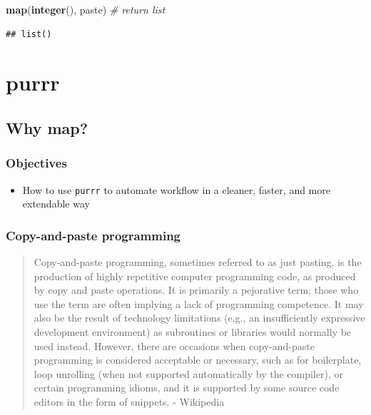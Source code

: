 \documentclass[
]{book}
\newenvironment{Shaded}{\begin{snugshade}}{\end{snugshade}}
\newcommand{\CommentTok}[1]{\textcolor[rgb]{0.56,0.35,0.01}{\textit{#1}}}
\newcommand{\FunctionTok}[1]{\textcolor[rgb]{0.13,0.29,0.53}{\textbf{#1}}}
\newcommand{\NormalTok}[1]{#1}
\providecommand{\tightlist}{%
  \setlength{\itemsep}{0pt}\setlength{\parskip}{0pt}}
\begin{document}
\begin{Shaded}
\begin{Highlighting}[]
\FunctionTok{map}\NormalTok{(}\FunctionTok{integer}\NormalTok{(), paste) }\CommentTok{\# return list}
\end{Highlighting}
\end{Shaded}

\begin{verbatim}
## list()
\end{verbatim}

\section{purrr}\label{purrr}

\subsection{Why map?}\label{why-map}

\subsubsection{Objectives}\label{objectives-1}

\begin{itemize}
\tightlist
\item
  How to use \texttt{purrr} to automate workflow in a cleaner, faster, and more extendable way
\end{itemize}

\subsubsection{Copy-and-paste programming}\label{copy-and-paste-programming}

\begin{quote}
Copy-and-paste programming, sometimes referred to as just pasting, is the production of highly repetitive computer programming code, as produced by copy and paste operations. It is primarily a pejorative term; those who use the term are often implying a lack of programming competence. It may also be the result of technology limitations (e.g., an insufficiently expressive development environment) as subroutines or libraries would normally be used instead. However, there are occasions when copy-and-paste programming is considered acceptable or necessary, such as for boilerplate, loop unrolling (when not supported automatically by the compiler), or certain programming idioms, and it is supported by some source code editors in the form of snippets. - Wikipedia
\end{quote}
\end{document}
